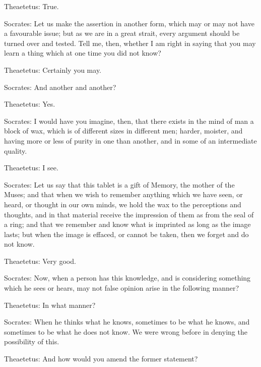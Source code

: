 Theaetetus: True.

Socrates: Let us make the assertion in another form, which may or may
not have a favourable issue; but as we are in a great strait, every
argument should be turned over and tested. Tell me, then, whether I am
right in saying that you may learn a thing which at one time you did not
know?

Theaetetus: Certainly you may.

Socrates: And another and another?

Theaetetus: Yes.

Socrates: I would have you imagine, then, that there exists in the mind
of man a block of wax, which is of different sizes in different men;
harder, moister, and having more or less of purity in one than another,
and in some of an intermediate quality.

Theaetetus: I see.

Socrates: Let us say that this tablet is a gift of Memory, the mother
of the Muses; and that when we wish to remember anything which we have
seen, or heard, or thought in our own minds, we hold the wax to the
perceptions and thoughts, and in that material receive the impression of
them as from the seal of a ring; and that we remember and know what is
imprinted as long as the image lasts; but when the image is effaced, or
cannot be taken, then we forget and do not know.

Theaetetus: Very good.

Socrates: Now, when a person has this knowledge, and is considering
something which he sees or hears, may not false opinion arise in the
following manner?

Theaetetus: In what manner?

Socrates: When he thinks what he knows, sometimes to be what he knows,
and sometimes to be what he does not know. We were wrong before in
denying the possibility of this.

Theaetetus: And how would you amend the former statement?

